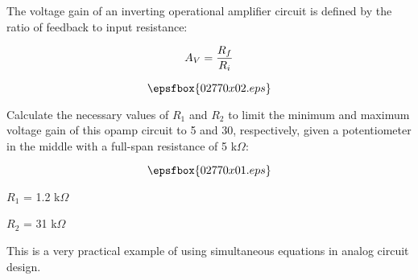 

The voltage gain of an inverting operational amplifier circuit is defined by the ratio of feedback to input resistance:

$$A_V = {R_f \over R_i}$$

$$\epsfbox{02770x02.eps}$$

Calculate the necessary values of $R_1$ and $R_2$ to limit the minimum and maximum voltage gain of this opamp circuit to 5 and 30, respectively, given a potentiometer in the middle with a full-span resistance of 5 k$\Omega$:

$$\epsfbox{02770x01.eps}$$







$R_1$ = 1.2 k$\Omega$

\vskip 10pt

$R_2$ = 31 k$\Omega$







This is a very practical example of using simultaneous equations in analog circuit design.




